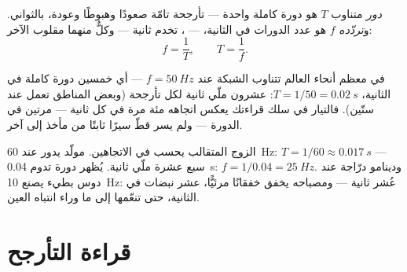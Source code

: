 \begin{definition}\label{def:g9:alternating-current:period}
\emph{دور}  متناوب $T$ هو  دورة كاملة واحدة
--- تأرجحة تامّة صعودًا وهبوطًا وعودة، بالثواني. و\emph{تردّده}
$f$ هو عدد الدورات في الثانية،  ---  ، تخدم
ثانية --- وكلٌّ منهما مقلوب الآخر:
\[
f = \frac{1}{T}, \qquad T = \frac{1}{f}.
\]
\end{definition}

\begin{proposition}\label{prop:g9:alternating-current:mains}
في معظم أنحاء العالم تتناوب الشبكة عند $f = \qty{50}{Hz}$ ---
أي خمسين دورة كاملة في الثانية،  $T = 1/50 =
\qty{0.02}{s}$: عشرون ملّي ثانية لكل تأرجحة (وبعض المناطق
تعمل عند ستّين). فالتيار في سلك  قراءتك يعكس اتجاهه مئة
مرة في كل ثانية --- مرتين في الدورة --- ولم يسر قطّ سيرًا
ثابتًا من مأخذ إلى آخر.
\end{proposition}

\begin{example}\label{ex:g9:alternating-current:arithmetic}
الزوج المتقالب يحسب في الاتجاهين. مولّد يدور عند
\qty{60}{Hz}: $T = 1/60 \approx \qty{0.017}{s}$ --- سبع عشرة
ملّي ثانية.  يُظهر دورة تدوم \qty{0.04}{s}:
$f = 1/0.04 = \qty{25}{Hz}$. ودينامو درّاجة عند دوس بطيء
يصنع \qty{10}{Hz}:  عُشر ثانية --- ومصباحه يخفق خفقانًا
مرئيًّا، عشر نبضات في الثانية، حتى تنعّمها  إلى ما وراء
انتباه العين.
\end{example}

\section{قراءة التأرجح}

